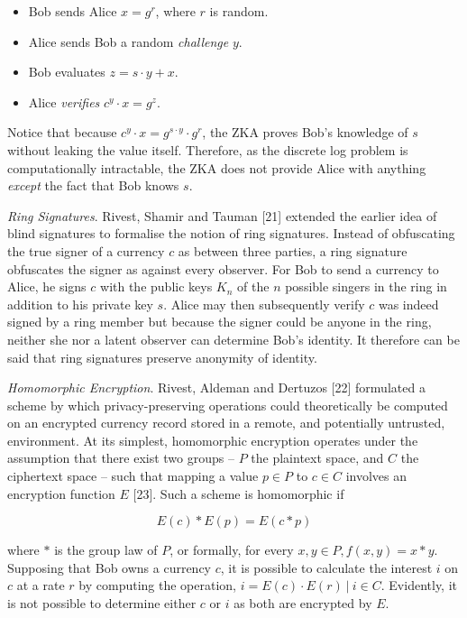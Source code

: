 \begin{itemize}
    \item Bob sends Alice $x = g^r$, where $r$ is random.
    \item Alice sends Bob a random \textit{challenge} $y$.
    \item Bob evaluates $z = s \cdot y + x$.
    \item Alice \textit{verifies} $c^y \cdot x = g^z$.
\end{itemize}

Notice that because $c^{y} \cdot x = g^{s \cdot y} \cdot g^r$, the ZKA proves Bob's knowledge of $s$ without leaking the value itself. Therefore, as the discrete log problem is computationally intractable,  the ZKA does not provide Alice with anything \textit{except} the fact that Bob knows $s$.

\textit{Ring Signatures}. Rivest, Shamir and Tauman [21] extended the earlier idea of blind signatures to formalise the notion of ring signatures. Instead of obfuscating the true signer of a currency $c$ as between three parties, a ring signature obfuscates the signer as against every observer. For Bob to send a currency to Alice, he signs $c$ with the public keys $K_n$ of the $n$ possible singers in the ring in addition to his private key $s$. Alice may then subsequently verify $c$ was indeed signed by a ring member but because the signer could be anyone in the ring, neither she nor a latent observer can determine Bob's identity. It therefore can be said that ring signatures preserve anonymity of identity.

\textit{Homomorphic Encryption}. Rivest, Aldeman and Dertuzos [22] formulated a scheme by which privacy-preserving operations could theoretically be computed on an encrypted currency record stored in a remote, and potentially untrusted, environment. At its simplest, homomorphic encryption operates under the assumption that there exist two groups -- $P$ the plaintext space, and $C$ the ciphertext space -- such that mapping a value $p \in P$ to $c \in C$ involves an encryption function $E$ [23]. Such a scheme is homomorphic if

\[E(c) \ast E(p) = E(c \ast p)\]

where $\ast$ is the group law of $P$, or formally, for every $x, y \in P, f(x, y) = x \ast y$. Supposing that Bob owns a currency $c$, it is possible to calculate the interest $i$ on $c$ at a rate $r$ by computing the operation, $i = E(c) \cdot E(r)\ |\ i \in C$. Evidently, it is not possible to determine either $c$ or $i$ as both are encrypted by $E$.
